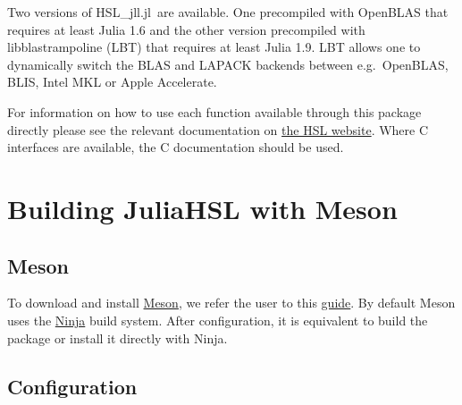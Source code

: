 \documentclass[gdweb]{geradwp}
\newcommand{\HSLjll}{HSL\_jll.jl}
\begin{document}
Two versions of \HSLjll~are available. One precompiled with OpenBLAS that requires at least Julia 1.6 and the other version precompiled with libblastrampoline (LBT) that requires at least Julia 1.9.
LBT allows one to dynamically switch the BLAS and LAPACK backends between e.g.\ OpenBLAS, BLIS, Intel MKL or Apple Accelerate.

For information on how to use each function available through this package directly please see the relevant documentation on \href{https://www.hsl.rl.ac.uk/catalogue/}{the HSL website}.
Where C interfaces are available, the C documentation should be used.

\section{Building JuliaHSL with Meson}

\subsection{Meson}

To download and install \href{https://mesonbuild.com}{Meson}, we refer the user to this \href{https://mesonbuild.com/SimpleStart.html}{guide}.
By default Meson uses the \href{https://ninja-build.org/}{Ninja} build system.
After configuration, it is equivalent to build the package or install it directly with Ninja.

\subsection{Configuration}
\end{document}
